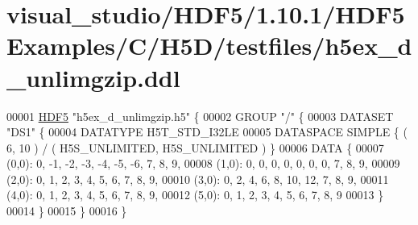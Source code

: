 \hypertarget{visual__studio_2_h_d_f5_21_810_81_2_h_d_f5_examples_2_c_2_h5_d_2testfiles_2h5ex__d__unlimgzip_8ddl_source}{}\section{visual\+\_\+studio/\+H\+D\+F5/1.10.1/\+H\+D\+F5\+Examples/\+C/\+H5\+D/testfiles/h5ex\+\_\+d\+\_\+unlimgzip.ddl}
\label{visual__studio_2_h_d_f5_21_810_81_2_h_d_f5_examples_2_c_2_h5_d_2testfiles_2h5ex__d__unlimgzip_8ddl_source}

\begin{DoxyCode}
00001 \hyperlink{namespace_h_d_f5}{HDF5} \textcolor{stringliteral}{"h5ex\_d\_unlimgzip.h5"} \{
00002 GROUP \textcolor{stringliteral}{"/"} \{
00003    DATASET \textcolor{stringliteral}{"DS1"} \{
00004       DATATYPE  H5T\_STD\_I32LE
00005       DATASPACE  SIMPLE \{ ( 6, 10 ) / ( H5S\_UNLIMITED, H5S\_UNLIMITED ) \}
00006       DATA \{
00007       (0,0): 0, -1, -2, -3, -4, -5, -6, 7, 8, 9,
00008       (1,0): 0, 0, 0, 0, 0, 0, 0, 7, 8, 9,
00009       (2,0): 0, 1, 2, 3, 4, 5, 6, 7, 8, 9,
00010       (3,0): 0, 2, 4, 6, 8, 10, 12, 7, 8, 9,
00011       (4,0): 0, 1, 2, 3, 4, 5, 6, 7, 8, 9,
00012       (5,0): 0, 1, 2, 3, 4, 5, 6, 7, 8, 9
00013       \}
00014    \}
00015 \}
00016 \}
\end{DoxyCode}
